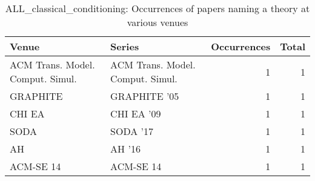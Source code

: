 \begin{table*}[t]
\begin{tabular}{llrr}
Venue & Series & Occurrences & Total\\\hline
\multirow{1}{*}{ACM Trans. Model. Comput. Simul.} & ACM Trans. Model. Comput. Simul. & 1 & \multirow{1}{*}{1}\\
\multirow{1}{*}{GRAPHITE } & GRAPHITE '05 & 1 & \multirow{1}{*}{1}\\
\multirow{1}{*}{CHI EA } & CHI EA '09 & 1 & \multirow{1}{*}{1}\\
\multirow{1}{*}{SODA } & SODA '17 & 1 & \multirow{1}{*}{1}\\
\multirow{1}{*}{AH } & AH '16 & 1 & \multirow{1}{*}{1}\\
\multirow{1}{*}{ACM-SE 14} & ACM-SE 14 & 1 & \multirow{1}{*}{1}\\
\end{tabular}
\caption{ALL\_classical\_conditioning: Occurrences of papers naming a theory at various venues}
\end{table*}